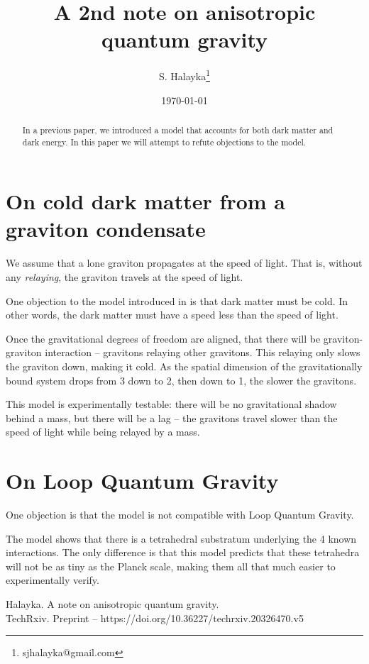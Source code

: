 \documentclass[12pt]{article}
\title{A 2nd note on anisotropic quantum gravity}
\author{S. Halayka\footnote{sjhalayka@gmail.com}}
\date{\today\;\currenttime}
\begin{document}
 
\maketitle

\begin{abstract}
In a previous paper, we introduced a model that accounts for both dark matter and dark energy. In this paper we will attempt to refute objections to the model.
\end{abstract}


\section{On cold dark matter from a graviton condensate}

We assume that a lone graviton propagates at the speed of light. That is, without any {\textit{relaying}}, the graviton travels at the speed of light.

One objection to the model introduced in \cite{halayka} is that dark matter must be cold. In other words, the dark matter must have a speed less than the speed of light.

Once the gravitational degrees of freedom are aligned, that there will be graviton-graviton interaction -- gravitons relaying other gravitons. This relaying only slows the graviton down, making it cold. As the spatial dimension of the gravitationally bound system drops from 3 down to 2, then down to 1, the slower the gravitons.

This model is experimentally testable: there will be no gravitational shadow behind a mass, but there will be a lag -- the gravitons travel slower than the speed of light while being relayed by a mass.





\section{On Loop Quantum Gravity}

One objection is that the model is not compatible with Loop Quantum Gravity.

The model shows that there is a tetrahedral substratum underlying the 4 known interactions.
The only difference is that this model predicts that these tetrahedra will not be as tiny as the Planck scale, making them all that much easier to experimentally verify.







\begin{thebibliography}{9}

 Halayka. A note on anisotropic quantum gravity.\\TechRxiv. Preprint -- https://doi.org/10.36227/techrxiv.20326470.v5


\end{thebibliography}
\end{document}
